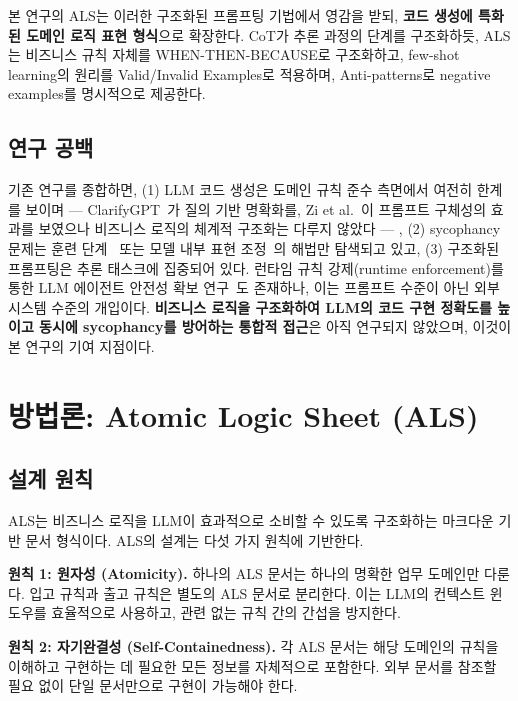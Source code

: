 \documentclass[conference]{IEEEtran}
\begin{document}
본 연구의 ALS는 이러한 구조화된 프롬프팅 기법에서 영감을 받되, \textbf{코드 생성에 특화된 도메인 로직 표현 형식}으로 확장한다. CoT가 추론 과정의 단계를 구조화하듯, ALS는 비즈니스 규칙 자체를 WHEN-THEN-BECAUSE로 구조화하고, few-shot learning의 원리를 Valid/Invalid Examples로 적용하며, Anti-patterns로 negative examples를 명시적으로 제공한다.

\subsection{연구 공백}

기존 연구를 종합하면, (1) LLM 코드 생성은 도메인 규칙 준수 측면에서 여전히 한계를 보이며 --- ClarifyGPT~\cite{mu2024clarifygpt}가 질의 기반 명확화를, Zi et al.~\cite{zi2025prompt}이 프롬프트 구체성의 효과를 보였으나 비즈니스 로직의 체계적 구조화는 다루지 않았다 --- , (2) sycophancy 문제는 훈련 단계~\cite{sharma2024sycophancy} 또는 모델 내부 표현 조정~\cite{li2025causm}의 해법만 탐색되고 있고, (3) 구조화된 프롬프팅은 추론 태스크에 집중되어 있다. 런타임 규칙 강제(runtime enforcement)를 통한 LLM 에이전트 안전성 확보 연구~\cite{wang2026agentspec}도 존재하나, 이는 프롬프트 수준이 아닌 외부 시스템 수준의 개입이다. \textbf{비즈니스 로직을 구조화하여 LLM의 코드 구현 정확도를 높이고 동시에 sycophancy를 방어하는 통합적 접근}은 아직 연구되지 않았으며, 이것이 본 연구의 기여 지점이다. 
\section{방법론: Atomic Logic Sheet (ALS)}

\subsection{설계 원칙}

ALS는 비즈니스 로직을 LLM이 효과적으로 소비할 수 있도록 구조화하는 마크다운 기반 문서 형식이다. ALS의 설계는 다섯 가지 원칙에 기반한다.

\textbf{원칙 1: 원자성 (Atomicity).} 하나의 ALS 문서는 하나의 명확한 업무 도메인만 다룬다. 입고 규칙과 출고 규칙은 별도의 ALS 문서로 분리한다. 이는 LLM의 컨텍스트 윈도우를 효율적으로 사용하고, 관련 없는 규칙 간의 간섭을 방지한다.

\textbf{원칙 2: 자기완결성 (Self-Containedness).} 각 ALS 문서는 해당 도메인의 규칙을 이해하고 구현하는 데 필요한 모든 정보를 자체적으로 포함한다. 외부 문서를 참조할 필요 없이 단일 문서만으로 구현이 가능해야 한다.
\end{document}
